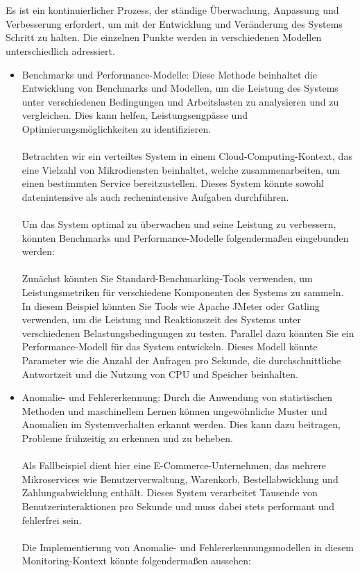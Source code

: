 \\\\
Es ist ein kontinuierlicher Prozess, der ständige Überwachung, Anpassung und Verbesserung erfordert, um mit der Entwicklung und Veränderung des Systems Schritt zu halten. Die einzelnen Punkte werden in verschiedenen Modellen unterschiedlich adressiert. 
\begin{itemize}
\item Benchmarks und Performance-Modelle: Diese Methode beinhaltet die Entwicklung von Benchmarks und Modellen, um die Leistung des Systems unter verschiedenen Bedingungen und Arbeitslasten zu analysieren und zu vergleichen. Dies kann helfen, Leistungsengpässe und Optimierungsmöglichkeiten zu identifizieren.
\\\\
Betrachten wir ein verteiltes System in einem Cloud-Computing-Kontext, das eine Vielzahl von Mikrodiensten beinhaltet, welche zusammenarbeiten, um einen bestimmten Service bereitzustellen. Dieses System könnte sowohl datenintensive als auch rechenintensive Aufgaben durchführen.
\\\\
Um das System optimal zu überwachen und seine Leistung zu verbessern, könnten Benchmarks und Performance-Modelle folgendermaßen eingebunden werden:
\\\\
Zunächst könnten Sie Standard-Benchmarking-Tools verwenden, um Leistungsmetriken für verschiedene Komponenten des Systems zu sammeln. In diesem Beispiel könnten Sie Tools wie Apache JMeter oder Gatling verwenden, um die Leistung und Reaktionszeit des Systems unter verschiedenen Belastungsbedingungen zu testen.
Parallel dazu könnten Sie ein Performance-Modell für das System entwickeln. Dieses Modell könnte Parameter wie die Anzahl der Anfragen pro Sekunde, die durchschnittliche Antwortzeit und die Nutzung von CPU und Speicher beinhalten.

\item Anomalie- und Fehlererkennung: Durch die Anwendung von statistischen Methoden und maschinellem Lernen können ungewöhnliche Muster und Anomalien im Systemverhalten erkannt werden. Dies kann dazu beitragen, Probleme frühzeitig zu erkennen und zu beheben.
\\\\
Als Fallbeispiel dient hier eine E-Commerce-Unternehmen, das mehrere Mikroservices wie Benutzerverwaltung, Warenkorb, Bestellabwicklung und Zahlungsabwicklung enthält. Dieses System verarbeitet Tausende von Benutzerinteraktionen pro Sekunde und muss dabei stets performant und fehlerfrei sein.
\\\\
Die Implementierung von Anomalie- und Fehlererkennungsmodellen in diesem Monitoring-Kontext könnte folgendermaßen aussehen:


\end{itemize}
